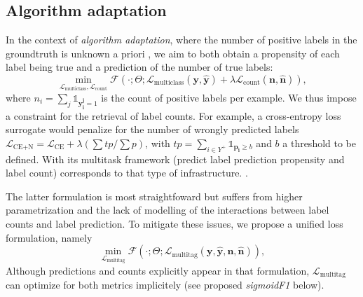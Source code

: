 \subsection{Algorithm adaptation}
In the context of \emph{algorithm adaptation}, where the number of positive labels in the groundtruth is unknown a priori , we aim to both obtain a propensity of each label being true and a prediction of the number of true labels:
%
\begin{equation}
\underset{\mathcal{L}_{\text {multiclass}}, \mathcal{L}_{\text {count}}} {\min} \mathcal{F}\left(\cdot ; \Theta; \mathcal{L}_{\text {multiclass}} (\mathbf{y}, \hat{\mathbf{y}}) + \lambda \mathcal{L}_{\text {count}} (\mathbf{n}, \hat{\mathbf{n}})\right),
\end{equation}
%
where \(n_i = \sum_j \mathds{1}_{\mathbf{y_i^j} = 1}\) is the count of positive labels per example. We thus impose a constraint for the retrieval of label counts. For example, a cross-entropy loss surrogate  would penalize for the number of wrongly predicted labels \(\mathcal{L}_{\text {CE+N}}= \mathcal{L}_{\text {CE}} + \lambda (\sum tp / \sum p)\), with \(t p=\sum_{i \in Y^{+}} \mathds{1}_{\mathbf{p_i} \geq b}\) and \(b\) a threshold to be defined. With its multitask framework (predict label prediction propensity and label count) \cite{multitaskLabel} corresponds to that type of infrastructure. .

The latter formulation is most straightfoward but suffers from higher parametrization and the lack of modelling of the interactions between label counts and label prediction. To mitigate these issues, we propose a unified loss formulation, namely
%
\begin{equation}
\underset{\mathcal{L}_{\text {multitag}}} {\min} \mathcal{F}\left(\cdot ; \Theta; \mathcal{L}_{\text {multitag}} (\mathbf{y}, \hat{\mathbf{y}}, \mathbf{n}, \hat{\mathbf{n}}) \right),
\end{equation}
%
Although predictions and counts explicitly appear in that formulation, \(\mathcal{L}_{\text {multitag}}\) can optimize for both metrics implicitely (see proposed \emph{sigmoidF1} below).





